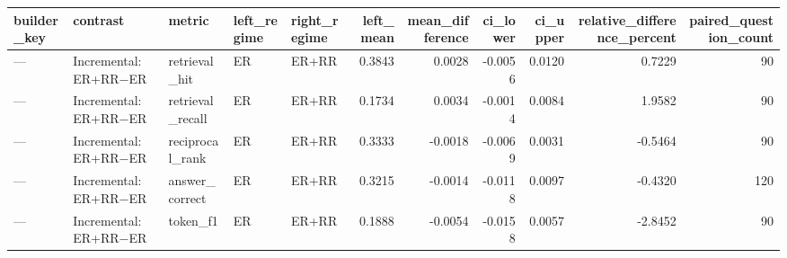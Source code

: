 \begin{tabular}{lllllrrrrrr}
\toprule
builder_key & contrast & metric & left_regime & right_regime & left_mean & mean_difference & ci_lower & ci_upper & relative_difference_percent & paired_question_count \\
\midrule
— & Incremental: ER+RR−ER & retrieval_hit & ER & ER+RR & 0.3843 & 0.0028 & -0.0056 & 0.0120 & 0.7229 & 90 \\
— & Incremental: ER+RR−ER & retrieval_recall & ER & ER+RR & 0.1734 & 0.0034 & -0.0014 & 0.0084 & 1.9582 & 90 \\
— & Incremental: ER+RR−ER & reciprocal_rank & ER & ER+RR & 0.3333 & -0.0018 & -0.0069 & 0.0031 & -0.5464 & 90 \\
— & Incremental: ER+RR−ER & answer_correct & ER & ER+RR & 0.3215 & -0.0014 & -0.0118 & 0.0097 & -0.4320 & 120 \\
— & Incremental: ER+RR−ER & token_f1 & ER & ER+RR & 0.1888 & -0.0054 & -0.0158 & 0.0057 & -2.8452 & 90 \\
\bottomrule
\end{tabular}
